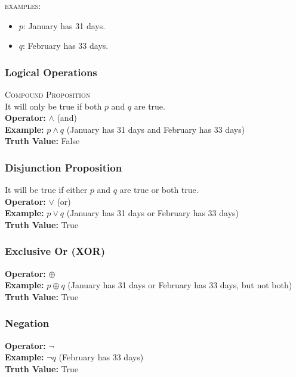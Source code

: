 \documentclass{article}
\begin{document}
\textsc{examples:}
\begin{itemize}
    \item $p$: January has 31 days.
    \item $q$: February has 33 days.
\end{itemize}

\subsubsection{Logical Operations}

\textsc{Compound Proposition} \\
\break
It will only be true if both $p$ and $q$ are true. \\
\break
\textbf{Operator:} $\land$ (and)  \\
\textbf{Example:} $p \land q$ (January has 31 days and February has 33 days)  \\
\textbf{Truth Value:} False

\subsubsection*{Disjunction Proposition}
It will be true if either $p$ and $q$ are true or both true. \\
\break
\textbf{Operator:} $\lor$ (or)  \\
\textbf{Example:} $p \lor q$ (January has 31 days or February has 33 days)  \\
\textbf{Truth Value:} True

\subsubsection*{Exclusive Or (XOR)}
\textbf{Operator:} $\oplus$  \\
\textbf{Example:} $p \oplus q$ (January has 31 days or February has 33 days, but not both)  \\
\textbf{Truth Value:} True

\subsubsection*{Negation}
\textbf{Operator:} $\neg$  \\
\textbf{Example:} $\neg q$ (February has 33 days)  \\
\textbf{Truth Value:} True
\end{document}
